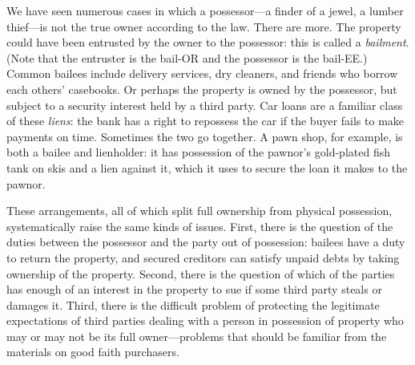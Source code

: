
We have seen numerous cases in which a possessor---a finder of a
jewel, a lumber thief---is not the true owner according to the law. There are
more. The property could have been entrusted by the owner to the possessor:
this is called a \textit{bailment}. (Note that the entruster is the bail-OR and
the possessor is the bail-EE.) Common bailees include delivery services, dry
cleaners, and friends who borrow each others' casebooks. Or perhaps the
property is owned by the possessor, but subject to a security interest held by
a third party. Car loans are a familiar class of these \textit{liens}: the bank
has a right to repossess the car if the buyer fails to make payments on time.
Sometimes the two go together. A pawn shop, for example, is both a bailee and
lienholder: it has possession of the pawnor's gold-plated fish tank on skis and
a lien against it, which it uses to secure the loan it makes to the pawnor.

These arrangements, all of which split full ownership from physical possession,
systematically raise the same kinds of issues. First, there is the question of
the duties between the possessor and the party out of possession: bailees have
a duty to return the property, and secured creditors can satisfy unpaid debts
by taking ownership of the property. Second, there is the question of which of
the parties has enough of an interest in the property to sue if some third
party steals or damages it. Third, there is the difficult problem of protecting
the legitimate expectations of third parties dealing with a person in
possession of property who may or may not be its full owner---problems that
should be familiar from the materials on good faith purchasers.

